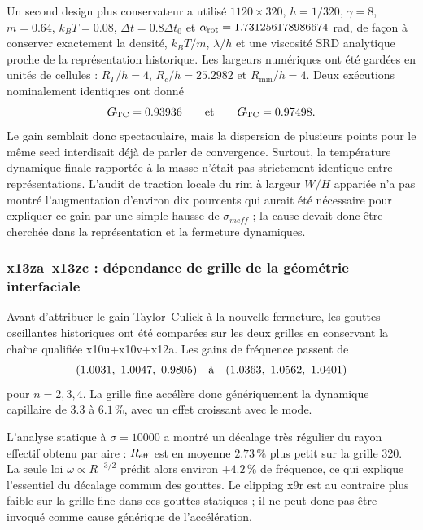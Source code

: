 \documentclass[11pt,a4paper]{article}
\begin{document}
Un second design plus conservateur a utilisé $1120\times320$, $h=1/320$, $\gamma=8$, $m=0.64$, $k_BT=0.08$, $\Delta t=0.8\Delta t_0$ et $\alpha_{\rm rot}=1.731256178986674$ rad, de façon à conserver exactement la densité, $k_BT/m$, $\lambda/h$ et une viscosité SRD analytique proche de la représentation historique. Les largeurs numériques ont été gardées en unités de cellules : $R_\Gamma/h=4$, $R_c/h=25.2982$ et $R_{\min}/h=4$. Deux exécutions nominalement identiques ont donné
\begin{equation}
 G_{\rm TC}=0.93936
 \qquad\hbox{et}\qquad
 G_{\rm TC}=0.97498.
\end{equation}
Le gain semblait donc spectaculaire, mais la dispersion de plusieurs points pour le même seed interdisait déjà de parler de convergence. Surtout, la température dynamique finale rapportée à la masse n'était pas strictement identique entre représentations. L'audit de traction locale du rim à largeur $W/H$ appariée n'a pas montré l'augmentation d'environ dix pourcents qui aurait été nécessaire pour expliquer ce gain par une simple hausse de $\sigma_{
m eff}$ ; la cause devait donc être cherchée dans la représentation et la fermeture dynamiques.

\subsubsection{x13za--x13zc : dépendance de grille de la géométrie interfaciale}

Avant d'attribuer le gain Taylor--Culick à la nouvelle fermeture, les gouttes oscillantes historiques ont été comparées sur les deux grilles en conservant la chaîne qualifiée x10u+x10v+x12a. Les gains de fréquence passent de
\begin{equation}
 (1.0031,\ 1.0047,\ 0.9805)
 \quad\hbox{à}\quad
 (1.0363,\ 1.0562,\ 1.0401)
\end{equation}
pour $n=2,3,4$. La grille fine accélère donc génériquement la dynamique capillaire de $3.3$ à $6.1\,\%$, avec un effet croissant avec le mode.

L'analyse statique à $\sigma=10000$ a montré un décalage très régulier du rayon effectif obtenu par aire : $R_{\rm eff}$ est en moyenne $2.73\,\%$ plus petit sur la grille 320. La seule loi $\omega\propto R^{-3/2}$ prédit alors environ $+4.2\,\%$ de fréquence, ce qui explique l'essentiel du décalage commun des gouttes. Le clipping x9r est au contraire plus faible sur la grille fine dans ces gouttes statiques ; il ne peut donc pas être invoqué comme cause générique de l'accélération.
\end{document}
